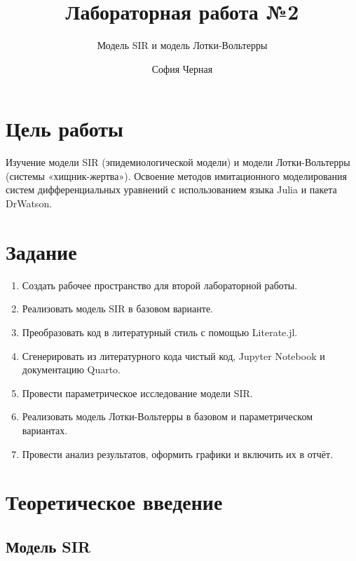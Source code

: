 \documentclass[
  letterpaper,
  DIV=11,
  numbers=noendperiod]{scrartcl}
\title{Лабораторная работа №2}
\subtitle{Модель SIR и модель Лотки-Вольтерры}
\author{София Черная}
\date{}
\providecommand{\tightlist}{%
  \setlength{\itemsep}{0pt}\setlength{\parskip}{0pt}}\usepackage{longtable,booktabs,array}
\renewcommand*\contentsname{Table of contents}
\newcommand\contentsname{Table of contents}
\begin{document}
\maketitle

\renewcommand*\contentsname{Table of contents}
{
\hypersetup{linkcolor=}
\setcounter{tocdepth}{3}
\tableofcontents
}

\section{Цель
работы}\label{ux446ux435ux43bux44c-ux440ux430ux431ux43eux442ux44b}

Изучение модели SIR (эпидемиологической модели) и модели Лотки-Вольтерры
(системы «хищник-жертва»). Освоение методов имитационного моделирования
систем дифференциальных уравнений с использованием языка Julia и пакета
DrWatson.

\section{Задание}\label{ux437ux430ux434ux430ux43dux438ux435}

\begin{enumerate}
\def\labelenumi{\arabic{enumi}.}
\tightlist
\item
  Создать рабочее пространство для второй лабораторной работы.
\item
  Реализовать модель SIR в базовом варианте.
\item
  Преобразовать код в литературный стиль с помощью Literate.jl.
\item
  Сгенерировать из литературного кода чистый код, Jupyter Notebook и
  документацию Quarto.
\item
  Провести параметрическое исследование модели SIR.
\item
  Реализовать модель Лотки-Вольтерры в базовом и параметрическом
  вариантах.
\item
  Провести анализ результатов, оформить графики и включить их в отчёт.
\end{enumerate}

\section{Теоретическое
введение}\label{ux442ux435ux43eux440ux435ux442ux438ux447ux435ux441ux43aux43eux435-ux432ux432ux435ux434ux435ux43dux438ux435}

\subsection{Модель SIR}\label{ux43cux43eux434ux435ux43bux44c-sir}
\end{document}
